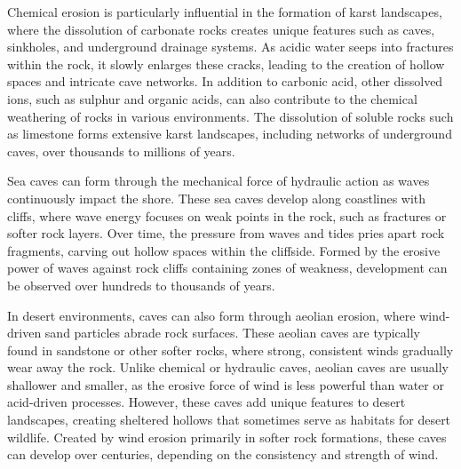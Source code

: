 Chemical erosion is particularly influential in the formation of karst landscapes, where the dissolution of carbonate rocks creates unique features such as caves, sinkholes, and underground drainage systems. As acidic water seeps into fractures within the rock, it slowly enlarges these cracks, leading to the creation of hollow spaces and intricate cave networks. In addition to carbonic acid, other dissolved ions, such as sulphur and organic acids, can also contribute to the chemical weathering of rocks in various environments. The dissolution of soluble rocks such as limestone forms extensive karst landscapes, including networks of underground caves, over thousands to millions of years.

Sea caves can form through the mechanical force of hydraulic action as waves continuously impact the shore. These sea caves develop along coastlines with cliffs, where wave energy focuses on weak points in the rock, such as fractures or softer rock layers. Over time, the pressure from waves and tides pries apart rock fragments, carving out hollow spaces within the cliffside. Formed by the erosive power of waves against rock cliffs containing zones of weakness, development can be observed over hundreds to thousands of years.

In desert environments, caves can also form through aeolian erosion, where wind-driven sand particles abrade rock surfaces. These aeolian caves are typically found in sandstone or other softer rocks, where strong, consistent winds gradually wear away the rock. Unlike chemical or hydraulic caves, aeolian caves are usually shallower and smaller, as the erosive force of wind is less powerful than water or acid-driven processes. However, these caves add unique features to desert landscapes, creating sheltered hollows that sometimes serve as habitats for desert wildlife. Created by wind erosion primarily in softer rock formations, these caves can develop over centuries, depending on the consistency and strength of wind.

\smallConclusion

